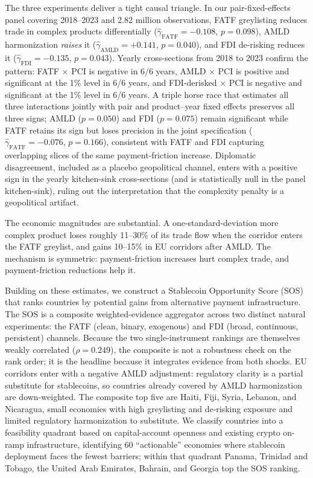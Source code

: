 The three experiments deliver a tight causal triangle. In our pair-fixed-effects panel covering 2018--2023 and 2.82 million observations, FATF greylisting reduces trade in complex products differentially ($\hat{\gamma}_{\text{FATF}} = -0.108$, $p = 0.098$), AMLD harmonization \emph{raises} it ($\hat{\gamma}_{\text{AMLD}} = +0.141$, $p = 0.040$), and FDI de-risking reduces it ($\hat{\gamma}_{\text{FDI}} = -0.135$, $p = 0.043$). Yearly cross-sections from 2018 to 2023 confirm the pattern: FATF $\times$ PCI is negative in 6/6 years, AMLD $\times$ PCI is positive and significant at the 1\% level in 6/6 years, and FDI-derisked $\times$ PCI is negative and significant at the 1\% level in 6/6 years. A triple horse race that estimates all three interactions jointly with pair and product--year fixed effects preserves all three signs; AMLD ($p=0.050$) and FDI ($p=0.075$) remain significant while FATF retains its sign but loses precision in the joint specification ($\hat{\gamma}_{\text{FATF}} = -0.076$, $p = 0.166$), consistent with FATF and FDI capturing overlapping slices of the same payment-friction increase. Diplomatic disagreement, included as a placebo geopolitical channel, enters with a positive sign in the yearly kitchen-sink cross-sections (and is statistically null in the panel kitchen-sink), ruling out the interpretation that the complexity penalty is a geopolitical artifact.

The economic magnitudes are substantial. A one-standard-deviation more complex product loses roughly 11--30\% of its trade flow when the corridor enters the FATF greylist, and gains 10--15\% in EU corridors after AMLD. The mechanism is symmetric: payment-friction increases hurt complex trade, and payment-friction reductions help it.

Building on these estimates, we construct a Stablecoin Opportunity Score (SOS) that ranks countries by potential gains from alternative payment infrastructure. The SOS is a composite weighted-evidence aggregator across two distinct natural experiments: the FATF (clean, binary, exogenous) and FDI (broad, continuous, persistent) channels. Because the two single-instrument rankings are themselves weakly correlated ($\rho = 0.249$), the composite is not a robustness check on the rank order; it is the headline because it integrates evidence from both shocks. EU corridors enter with a negative AMLD adjustment: regulatory clarity is a partial substitute for stablecoins, so countries already covered by AMLD harmonization are down-weighted. The composite top five are Haiti, Fiji, Syria, Lebanon, and Nicaragua, small economies with high greylisting and de-risking exposure and limited regulatory harmonization to substitute. We classify countries into a feasibility quadrant based on capital-account openness and existing crypto on-ramp infrastructure, identifying 60 ``actionable'' economies where stablecoin deployment faces the fewest barriers; within that quadrant Panama, Trinidad and Tobago, the United Arab Emirates, Bahrain, and Georgia top the SOS ranking.

